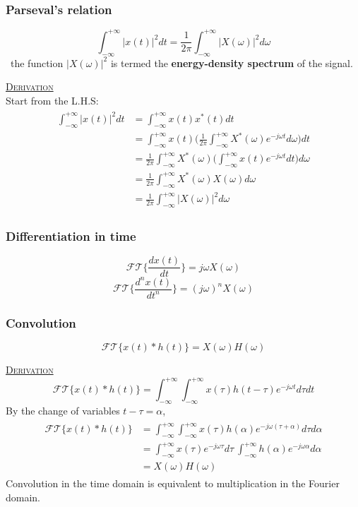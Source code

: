 \documentclass[12pt,a4paper]{article}
\begin{document}
\subsubsection{Parseval's relation}
\[ \int_{-\infty}^{+\infty} \lvert x(t) \rvert^{2} dt = \frac{1}{2\pi} \int_{-\infty}^{+\infty} \lvert X(\omega) \rvert^{2} d\omega \]
\ the function $\lvert X(\omega) \rvert^{2}$ is termed the \textbf{energy-density spectrum} of the signal.
\begin{tcolorbox}[breakable]
\underline{\textsc{Derivation}}\\
Start from the L.H.S:
\begin{align*} \begin{split}
 \int_{-\infty}^{+\infty} \lvert x(t) \rvert^{2} dt &= \int_{-\infty}^{+\infty} x(t) x^{*}(t) dt \\
&= \int_{-\infty}^{+\infty} x(t) \bigg( \frac{1}{2\pi} \int_{-\infty}^{+\infty} X^{*}(\omega) e^{-j\omega t} d\omega \bigg) dt\\
&= \frac{1}{2\pi} \int_{-\infty}^{+\infty} X^{*}(\omega)\bigg( \int_{-\infty}^{+\infty} x(t) e^{-j\omega t} dt \bigg) d\omega \\
&= \frac{1}{2\pi} \int_{-\infty}^{+\infty} X^{*}(\omega)X(\omega) d\omega \\
& = \frac{1}{2\pi} \int_{-\infty}^{+\infty}  \lvert X(\omega) \rvert^{2} d\omega 
\end{split} \end{align*}
\end{tcolorbox}

\subsubsection{Differentiation in time}
\[ \mathcal{FT} \bigg\{ \frac{dx(t)}{dt} \bigg\} = j\omega X(\omega) \]
\[ \mathcal{FT} \bigg\{ \frac{d^{n}x(t)}{dt^{n}} \bigg\} = (j\omega)^{n} X(\omega) \]

\subsubsection{Convolution}
\[ \mathcal{FT}\{ x(t)*h(t) \} = X(\omega)H(\omega) \]
\begin{tcolorbox}[breakable]
\underline{\textsc{Derivation}}\\
\[ \mathcal{FT}\{ x(t)*h(t)\} = \int_{-\infty}^{+\infty}\int_{-\infty}^{+\infty} x(\tau)h(t-\tau)e^{-j\omega t}d\tau dt \]
By the change of variables $t-\tau = \alpha$,
\begin{align*} \begin{split}
 \mathcal{FT}\{ x(t)*h(t)\} &= \int_{-\infty}^{+\infty}\int_{-\infty}^{+\infty} x(\tau)h(\alpha)e^{-j\omega (\tau+\alpha)}d\tau d\alpha \\
 &=\int_{-\infty}^{+\infty}x(\tau)e^{-j\omega \tau}d\tau \ \int_{-\infty}^{+\infty}h(\alpha)e^{-j\omega \alpha}d\alpha\\
 &= X(\omega)H(\omega)
 \end{split} \end{align*}
 Convolution in the time domain is equivalent to multiplication in the Fourier domain.
\end{tcolorbox}
\end{document}
